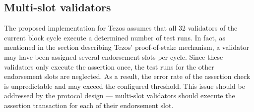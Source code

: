 \subsection{Multi-slot validators}
The proposed implementation for Tezos assumes that all 32 validators of the current block cycle execute a determined number of test runs. In fact, as mentioned in the section describing Tezos' proof-of-stake mechanism, a validator may have been assigned several endorsement slots per cycle. Since these validators only execute the assertion once, the test runs for the other endorsement slots are neglected. As a result, the error rate of the assertion check is unpredictable and may exceed the configured threshold. This issue should be addressed by the protocol design --- multi-slot validators should execute the assertion transaction for each of their endorsement slot.
